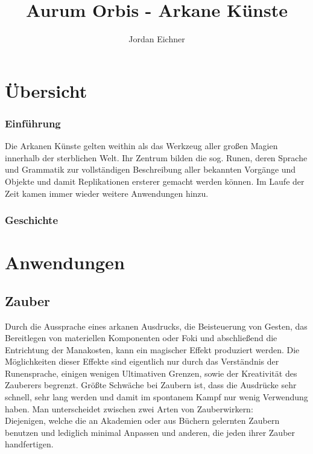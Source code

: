 \documentclass[a4paper,12pt,oneside]{book}
\title{Aurum Orbis - Arkane Künste}
\author{Jordan Eichner}
\date{}
\begin{document}
\maketitle
\tableofcontents

\part{Übersicht}
\section{Einführung}
Die Arkanen Künste gelten weithin als das Werkzeug aller großen Magien innerhalb der sterblichen Welt. Ihr Zentrum bilden die sog. Runen, deren Sprache und Grammatik zur vollständigen Beschreibung aller bekannten Vorgänge und Objekte und damit Replikationen ersterer gemacht werden können. Im Laufe der Zeit kamen immer wieder weitere Anwendungen hinzu.

\section{Geschichte}


\part{Anwendungen}

\chapter{Zauber}
Durch die Aussprache eines arkanen Ausdrucks, die Beisteuerung von Gesten, das Bereitlegen von materiellen Komponenten oder Foki und abschließend die Entrichtung der Manakosten, kann ein magischer Effekt produziert werden. Die Möglichkeiten dieser Effekte sind eigentlich nur durch das Verständnis der Runensprache, einigen wenigen Ultimativen Grenzen, sowie der Kreativität des Zauberers begrenzt. Größte Schwäche bei Zaubern ist, dass die Ausdrücke sehr schnell, sehr lang werden und damit im spontanem Kampf nur wenig Verwendung haben. Man unterscheidet zwischen zwei Arten von Zauberwirkern:
\\Diejenigen, welche die an Akademien oder aus Büchern gelernten Zaubern benutzen und lediglich minimal Anpassen und
anderen, die jeden ihrer Zauber handfertigen.
\end{document}
